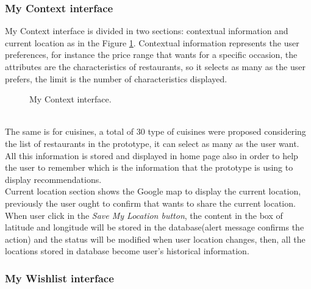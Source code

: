 \subsubsection{My Context interface}

My Context interface is divided in two sections: contextual 
information and current location as in the Figure  \ref{fig:mycontext}.
Contextual information represents the user preferences, for instance
the price range that wants for a specific occasion, the attributes are
the characteristics of restaurants, so it selects as many as the user
prefers, the limit is the number of characteristics displayed. 
 \begin{figure}
\captionsetup{font=footnotesize}
\centering
{}
\caption{My Context interface.}
\label{fig:mycontext}   
\end{figure}
\\ The same is for cuisines, a total of 30 type of cuisines were
proposed considering the list of restaurants in the prototype, it can
select as many as the user want.  \\All this information is stored and
displayed in home page also in order to help the user to remember
which is the information that the prototype is using to display
recommendations.\\  Current location section shows the Google map to
display the current location, previously the user ought to confirm
that wants to share the current location. \\  When user click in the
\textit{Save My Location button}, the content in the box of latitude
and longitude will be stored in the database(alert message  confirms
the action) and the status will be modified when user location
changes, then, all the locations stored in database become user's
historical information.

\subsubsection{My Wishlist interface}

